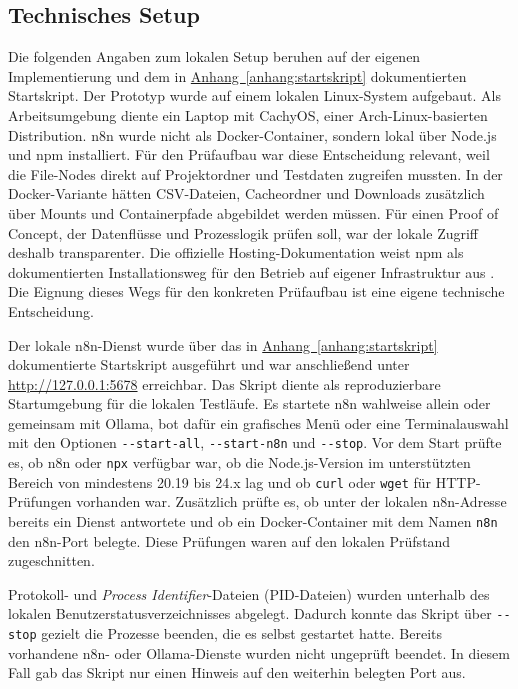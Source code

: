 \documentclass[a4paper,12pt]{article}
\begin{document}
\subsection{Technisches Setup}
Die folgenden Angaben zum lokalen Setup beruhen auf der eigenen Implementierung und dem in \hyperref[anhang:startskript]{Anhang~\ref*{anhang:startskript}} dokumentierten Startskript. Der Prototyp wurde auf einem lokalen Linux-System aufgebaut. Als Arbeitsumgebung diente ein Laptop mit CachyOS, einer Arch-Linux-basierten Distribution. n8n wurde nicht als Docker-Container, sondern lokal über Node.js und npm installiert. Für den Prüfaufbau war diese Entscheidung relevant, weil die File-Nodes direkt auf Projektordner und Testdaten zugreifen mussten. In der Docker-Variante hätten CSV-Dateien, Cacheordner und Downloads zusätzlich über Mounts und Containerpfade abgebildet werden müssen. Für einen Proof of Concept, der Datenflüsse und Prozesslogik prüfen soll, war der lokale Zugriff deshalb transparenter. Die offizielle Hosting-Dokumentation weist npm als dokumentierten Installationsweg für den Betrieb auf eigener Infrastruktur aus \parencite{n8n_docs_2026}. Die Eignung dieses Wegs für den konkreten Prüfaufbau ist eine eigene technische Entscheidung.

Der lokale n8n-Dienst wurde über das in \hyperref[anhang:startskript]{Anhang~\ref*{anhang:startskript}} dokumentierte Startskript ausgeführt und war anschließend unter \url{http://127.0.0.1:5678} erreichbar. Das Skript diente als reproduzierbare Startumgebung für die lokalen Testläufe. Es startete n8n wahlweise allein oder gemeinsam mit Ollama, bot dafür ein grafisches Menü oder eine Terminalauswahl mit den Optionen \texttt{-{}-start-all}, \texttt{-{}-start-n8n} und \texttt{-{}-stop}. Vor dem Start prüfte es, ob n8n oder \texttt{npx} verfügbar war, ob die Node.js-Version im unterstützten Bereich von mindestens 20.19 bis 24.x lag und ob \texttt{curl} oder \texttt{wget} für HTTP-Prüfungen vorhanden war. Zusätzlich prüfte es, ob unter der lokalen n8n-Adresse bereits ein Dienst antwortete und ob ein Docker-Container mit dem Namen \texttt{n8n} den n8n-Port belegte. Diese Prüfungen waren auf den lokalen Prüfstand zugeschnitten.

Protokoll- und \textit{Process Identifier}-Dateien (PID-Dateien) wurden unterhalb des lokalen Benutzerstatusverzeichnisses abgelegt. Dadurch konnte das Skript über \texttt{-{}-stop} gezielt die Prozesse beenden, die es selbst gestartet hatte. Bereits vorhandene n8n- oder Ollama-Dienste wurden nicht ungeprüft beendet. In diesem Fall gab das Skript nur einen Hinweis auf den weiterhin belegten Port aus.
\end{document}
